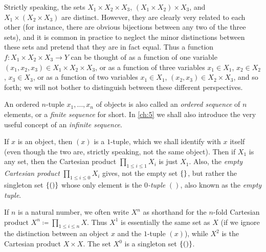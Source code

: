 \begin{note}
	Strictly speaking, the sets \(X_1 \times X_2 \times X_3\), \((X_1 \times X_2) \times X_3\), and \(X_1 \times (X_2 \times X_3)\) are distinct.
	However, they are clearly very related to each other (for instance, there are obvious bijections between any two of the three sets), and it is common in practice to neglect the minor distinctions between these sets and pretend that they are in fact equal.
	Thus a function \(f : X_1 \times X_2 \times X_3 \to Y\) can be thought of as a function of one variable \((x_1, x_2, x_3) \in X_1 \times X_2 \times X_3\), or as a function of three variables \(x_1 \in X_1\), \(x_2 \in X_2\), \(x_3 \in X_3\), or as a function of two variables \(x_1 \in X_1\), \((x_2, x_3) \in X_2 \times X_3\), and so forth;
	we will not bother to distinguish between these different perspectives.
\end{note}

\setcounter{thm}{9}
\begin{rmk}\label{3.5.10}
	An ordered \(n\)-tuple \(x_1, \dots, x_n\) of objects is also called an \emph{ordered sequence} of \(n\) elements, or a \emph{finite sequence} for short.
	In \cref{ch:5} we shall also introduce the very useful concept of an \emph{infinite sequence}.
\end{rmk}

\begin{eg}\label{3.5.11}
	If \(x\) is an object, then \((x)\) is a \(1\)-tuple, which we shall identify with \(x\) itself (even though the two are, strictly speaking, not the same object).
	Then if \(X_1\) is any set, then the Cartesian product \(\prod_{1 \leq i \leq 1} X_i\) is just \(X_1\).
	Also, the \emph{empty Cartesian product} \(\prod_{1 \leq i \leq 0} X_i\) gives, not the empty set \(\left\lbrace\right\rbrace\), but rather the singleton set \(\left\lbrace()\right\rbrace\) whose only element is the \emph{\(0\)-tuple} \(()\), also known as the \emph{empty tuple}.

	If \(n\) is a natural number, we often write \(X^n\) as shorthand for the \(n\)-fold Cartesian product \(X^n \coloneqq \prod_{1 \leq i \leq n} X\).
	Thus \(X^1\) is essentially the same set as \(X\) (if we ignore the distinction between an object \(x\) and the \(1\)-tuple \((x)\)), while \(X^2\) is the Cartesian product \(X \times X\).
	The set \(X^0\) is a singleton set \(\left\lbrace()\right\rbrace\).
\end{eg}

